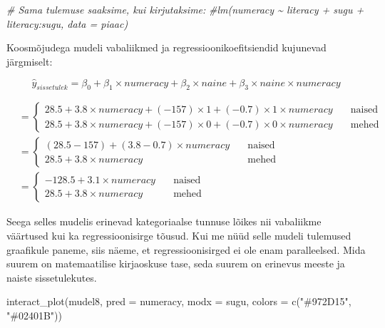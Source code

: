 \documentclass[
]{book}
\newenvironment{Shaded}{\begin{snugshade}}{\end{snugshade}}
\newcommand{\AttributeTok}[1]{\textcolor[rgb]{0.77,0.63,0.00}{#1}}
\newcommand{\CommentTok}[1]{\textcolor[rgb]{0.56,0.35,0.01}{\textit{#1}}}
\newcommand{\FunctionTok}[1]{\textcolor[rgb]{0.00,0.00,0.00}{#1}}
\newcommand{\NormalTok}[1]{#1}
\newcommand{\StringTok}[1]{\textcolor[rgb]{0.31,0.60,0.02}{#1}}
\begin{document}
\begin{Shaded}
\begin{Highlighting}[]
\CommentTok{\# Sama tulemuse saaksime, kui kirjutaksime:}
\CommentTok{\#lm(numeracy \textasciitilde{} literacy + sugu + literacy:sugu, data = piaac)}
\end{Highlighting}
\end{Shaded}

Koosmõjudega mudeli vabaliikmed ja regressioonikoefitsiendid kujunevad järgmiselt:

\[\hat{y}_{sissetulek}=\beta_0+\beta_1 \times numeracy + \beta_2 \times naine + \beta_3 \times naine \times numeracy\]

\begin{align}
&=
  \begin{cases}
    28.5+3.8 \times numeracy + (-157) \times 1 + (-0.7) \times 1 \times numeracy & \quad \text{naised}\\
    28.5+3.8 \times numeracy + (-157) \times 0 + (-0.7) \times 0 \times numeracy & \quad \text{mehed}
  \end{cases}\\
&=
  \begin{cases}
    (28.5-157)+(3.8-0.7) \times numeracy  & \quad \text{naised}\\
    28.5+3.8 \times numeracy & \quad \text{mehed}
  \end{cases}\\
&=
  \begin{cases}
    -128.5+3.1 \times numeracy  & \quad \text{naised}\\
    28.5+3.8 \times numeracy & \quad \text{mehed}
  \end{cases}
\end{align}

Seega selles mudelis erinevad kategoriaalse tunnuse lõikes nii vabaliikme väärtused kui ka regressioonisirge tõusud. Kui me nüüd selle mudeli tulemused graafikule paneme, siis näeme, et regressioonisirged ei ole enam paralleelsed. Mida suurem on matemaatilise kirjaoskuse tase, seda suurem on erinevus meeste ja naiste sissetulekutes.

\begin{Shaded}
\begin{Highlighting}[]
\FunctionTok{interact\_plot}\NormalTok{(mudel8, }\AttributeTok{pred =}\NormalTok{ numeracy, }\AttributeTok{modx =}\NormalTok{ sugu,  }\AttributeTok{colors =}  \FunctionTok{c}\NormalTok{(}\StringTok{"\#972D15"}\NormalTok{, }\StringTok{"\#02401B"}\NormalTok{))}
\end{Highlighting}
\end{Shaded}
\end{document}
